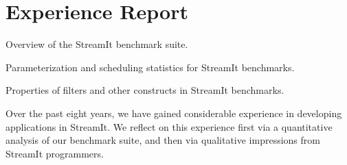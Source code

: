 
\section{Experience Report}
\label{sec:lang-experience}

\begin{table}[t!]
\vspace{-1\baselineskip}
\vspace{-1.5\baselineskip}
\caption{Overview of the StreamIt benchmark suite.\protect\label{tab:lang-benchmarks}}
\vspace{-0.5in}
\end{table}

\begin{table}[t!]
\vspace{-1.5\baselineskip}
\vspace{-1.5\baselineskip}
\caption{Parameterization and scheduling statistics for StreamIt 
benchmarks.\protect\label{tab:lang-benchmarks-params}}
\vspace{-0.5in}
\end{table}

\begin{table}[t!]
\vspace{-2\baselineskip}
\vspace{-1.5\baselineskip}
\caption{Properties of filters and other constructs in StreamIt 
benchmarks.\protect\label{tab:lang-benchmarks-filters}}
\vspace{-0.5in}
\end{table}

Over the past eight years, we have gained considerable experience in
developing applications in StreamIt.  We reflect on this experience
first via a quantitative analysis of our benchmark suite, and then via
qualitative impressions from StreamIt programmers.

